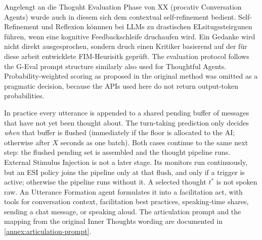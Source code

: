Angelengt an die Thoguht Evaluation Phase von XX (procativ Conversation Agents) wurde auch in diesem sich dem
contextual self-refinement bedient.
Self-Refinement und Reflexion könnnen bei LLMs zu drastischen ELsitugssteirgunen führen, wenn eine kognitive
Feedbackschleife druchaufen wird. \cite[p. 18]{meiSurveyContextEngineering2025} Ein Gedanke wird nicht direkt
ausgesprochen, sondern druch einen Kritiker basierend auf der für diese arbeit entwicklete FIM-Heurisitk geprüft.
The evaluation protocol follows the G-Eval prompt structure \cite[p. 2512]{liuGEvalNLGEvaluation2023}
similarly also used for Thoughtful Agents. Probability-weighted scoring as proposed in the original method
was omitted as a pragmatic decision, because the APIs used here do not return output-token probabilities.

In practice every utterance is appended to a shared pending buffer of messages that have not yet
been thought about. The turn-taking prediction only decides \emph{when} that buffer is flushed
(immediately if the floor is allocated to the AI; otherwise after $X$ seconds as one batch). Both
cases continue to the same next step: the flushed pending set is assembled and the thought pipeline
runs. External Stimulus Injection is not a later stage. Its monitors run continuously, but an ESI
policy joins the pipeline only at that flush, and only if a trigger is active; otherwise the
pipeline runs without it. A selected thought $t^{*}$ is not spoken raw. An Utterance Formation
agent formulates it into a facilitation act, with tools for conversation context, facilitation best
practices, speaking-time shares, sending a chat message, or speaking aloud.
The articulation prompt and the mapping from the original Inner Thoughts
wording are documented in \autoref{annex:articulation-prompt}.

